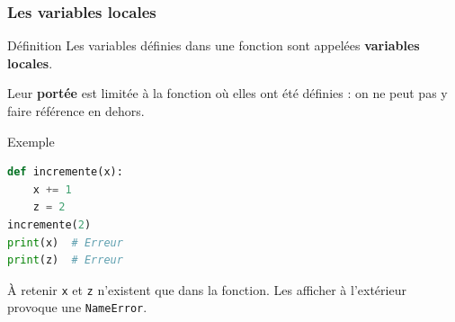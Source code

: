 \documentclass[10pt, xcolor={svgnames}]{beamer}
\begin{document}
\begin{frame}[containsverbatim]
	\frametitle{Les variables locales}
	
	\begin{block}{Définition}
		Les variables définies dans une fonction sont appelées
		\textbf{variables locales}.
		
		Leur \textbf{portée} est limitée à la fonction où elles
		ont été définies : on ne peut pas y faire référence
		en dehors.
	\end{block}
	
	\vspace{0.15cm}
	
	\begin{exampleblock}{Exemple}
		\begin{lstlisting}[language=Python]
def incremente(x):
	x += 1
	z = 2  
incremente(2)
print(x)  # Erreur
print(z)  # Erreur
		\end{lstlisting}
	\end{exampleblock}
	
	\begin{alertblock}{À retenir}
		\texttt{x} et \texttt{z} n'existent que dans la fonction.
		Les afficher à l'extérieur provoque une \texttt{NameError}.
	\end{alertblock}
\end{frame}
\end{document}
